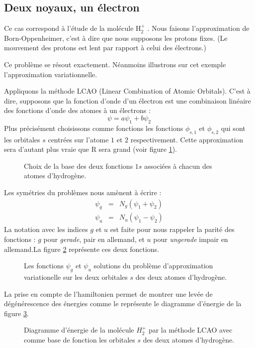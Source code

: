 \documentclass[12pt]{book}
\begin{document}
\subsection{Deux noyaux, un \'electron}
Ce cas correspond \`a l'\'etude de la mol\'ecule H$_2^+$
\cite{ph:mecaq:Rivail89,ph:mecaq:Cohen73}. 
Nous faisons l'approximation de Born-Oppenheimer, c'est \`a dire que
nous supposons les protons fixes. (Le mouvement des protons est lent
par rapport \`a celui des \'electrons.)
\begin{rem} Ce probl\`eme se r\'esout exactement. N\'eanmoins
illustrons sur cet exemple l'approximation variationnelle.
\end{rem}
Appliquons la m\'ethode LCAO (Linear Combination of Atomic Orbitals).
C'est \`a dire, supposons que la fonction d'onde d'un \'electron est une
combinaison lin\'eaire des fonctions d'onde des atomes \`a un
\'electrons : 
\begin{equation}
\psi=a\psi_1+b\psi_2
\end{equation}
Plus pr\'ecis\'ement choisissons comme fonctions les fonctions
$\phi_{s,1}$ et $\phi_{s,2}$ qui sont les orbitales $s$ centr\'ees sur
l'atome $1$ et $2$ respectivement.
Cette approximation sera d'autant plus vraie que R sera grand (voir
figure \ref{figH2plusS}).
\begin{figure}[htb]
 \centerline{}   
 \caption{Choix de la base des deux fonctions $1s$ associ\'ees \`a
chacun des atomes d'hydrog\`ene.}
 \label{figH2plusS}
\end{figure}
Les sym\'etries du probl\`emes nous am\`enent \`a \'ecrire :
\begin{eqnarray}
\psi_g&=&N_g(\psi_1+\psi_2)\\
\psi_u&=&N_u(\psi_1-\psi_2)
\end{eqnarray}
La notation avec les indices $g$ et $u$ est faite pour nous rappeler
la parit\'e des fonctions : $g$ pour {\it gerade}, pair en allemand, et
$u$ pour {\it ungerade} impair en allemand.La figure
\ref{figH2plusLCAO} repr\'esente ces deux fonctions.
\begin{figure}[htb]
 \caption{Les fonctions $\psi_g$ et $\psi_u$ solutions du probl\`eme
d'approximation variationelle sur les deux orbitales $s$ des deux
atomes d'hydrog\`ene.}
 \label{figH2plusLCAO}
\end{figure}
La prise en compte de l'hamiltonien permet de montrer une lev\'ee de
d\'eg\'en\'erescence des \'energies comme le repr\'esente le diagramme
d'\'energie de la figure \ref{figH2plusLCAOener}.
\begin{figure}[htb]
 \centerline{}   
 \caption{Diagramme d'\'energie de la mol\'ecule $H_2^+$ par la
m\'ethode LCAO avec comme base de fonction les orbitales $s$ des deux
atomes d'hydrog\`ene.}
 \label{figH2plusLCAOener}
\end{figure}
\end{document}
